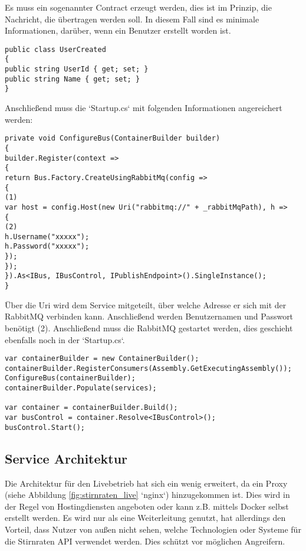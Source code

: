 Es muss ein sogenannter Contract erzeugt werden, dies ist im Prinzip, die Nachricht, die übertragen werden soll. In diesem Fall sind es minimale Informationen, darüber, wenn ein Benutzer erstellt worden ist.

\begin{verbatim}
public class UserCreated
{
public string UserId { get; set; }
public string Name { get; set; }
}
\end{verbatim}

Anschließend muss die `Startup.cs` mit folgenden Informationen angereichert werden: 

\begin{verbatim}
private void ConfigureBus(ContainerBuilder builder)
{
builder.Register(context =>
{
return Bus.Factory.CreateUsingRabbitMq(config =>
{ 
(1)
var host = config.Host(new Uri("rabbitmq://" + _rabbitMqPath), h =>
{
(2)
h.Username("xxxxx"); 
h.Password("xxxxx");
});
});
}).As<IBus, IBusControl, IPublishEndpoint>().SingleInstance();
}
\end{verbatim}

Über die Uri wird dem Service mitgeteilt, über welche Adresse er sich mit der RabbitMQ verbinden kann. Anschließend werden Benutzernamen und Passwort benötigt (2). Anschließend muss die RabbitMQ gestartet werden, dies geschieht ebenfalls noch in der `Startup.cs`.

\begin{verbatim}
var containerBuilder = new ContainerBuilder();
containerBuilder.RegisterConsumers(Assembly.GetExecutingAssembly());
ConfigureBus(containerBuilder);
containerBuilder.Populate(services);

var container = containerBuilder.Build();
var busControl = container.Resolve<IBusControl>();
busControl.Start();
\end{verbatim}



\subsection{Service Architektur}

Die Architektur für den Livebetrieb hat sich ein wenig erweitert, da ein Proxy (siehe Abbildung \ref{fig:stirnraten_live} `nginx`) hinzugekommen ist. Dies wird in der Regel von Hostingdiensten angeboten oder kann z.B. mittels Docker selbst erstellt werden. Es wird nur als eine Weiterleitung genutzt, hat allerdings den Vorteil, dass Nutzer von außen nicht sehen, welche Technologien oder Systeme für die Stirnraten API verwendet werden. Dies schützt vor möglichen Angreifern.

